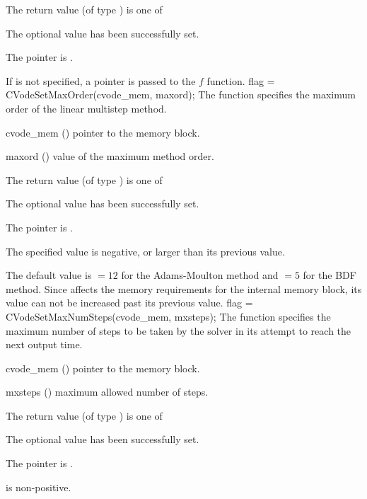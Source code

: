 {
  The return value  (of type ) is one of
  \begin{args}
  \item[\Id{CV\_SUCCESS}] 
    The optional value has been successfully set.
  \item[\Id{CV\_MEM\_NULL}]
    The  pointer is .
  \end{args}
}
{
  If  is not specified, a  pointer is
  passed to the $f$ function.
}
{
flag = CVodeSetMaxOrder(cvode\_mem, maxord);
}
{
  The function  specifies the maximum order of the 
  linear multistep method.
}
{
  \begin{args}
  \item[cvode\_mem] ()
    pointer to the {\cvode} memory block.
  \item[maxord] ()
    value of the maximum method order.
  \end{args}
}
{
  The return value  (of type ) is one of
  \begin{args}
  \item[\Id{CV\_SUCCESS}] 
    The optional value has been successfully set.
  \item[\Id{CV\_MEM\_NULL}]
    The  pointer is .
  \item[\Id{CV\_ILL\_INPUT}]
    The specified value  is negative, or larger than 
    its previous value.
  \end{args}
}
{
  The default value is  $= 12$ for
  the Adams-Moulton method and  $= 5$
  for the BDF method.
  Since  affects the memory requirements
  for the internal {\cvode} memory block, its value
  can not be increased past its previous value.
}
{
flag = CVodeSetMaxNumSteps(cvode\_mem, mxsteps);
}
{
  The function  specifies the maximum number
  of steps to be taken by the solver in its attempt to reach 
  the next output time.
}
{
  \begin{args}
  \item[cvode\_mem] ()
    pointer to the {\cvode} memory block.
  \item[mxsteps] ()
    maximum allowed number of steps.
  \end{args}
}
{
  The return value  (of type ) is one of
  \begin{args}
  \item[\Id{CV\_SUCCESS}] 
    The optional value has been successfully set.
  \item[\Id{CV\_MEM\_NULL}]
    The  pointer is .
  \item[\Id{CV\_ILL\_INPUT}]
     is non-positive.
  \end{args}
}
